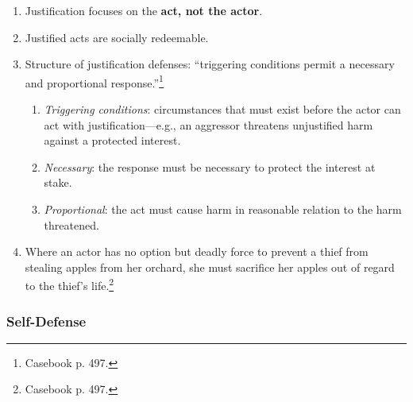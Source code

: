 \begin{enumerate}
    \item Justification focuses on the \textbf{act, not the actor}.
    \item Justified acts are socially redeemable.
    \item Structure of justification defenses: ``triggering conditions permit 
    a necessary and proportional response.''\footnote{Casebook p. 497.}
    \begin{enumerate}
        \item \emph{Triggering conditions}: circumstances that must exist 
        before the actor can act with justification---e.g., an aggressor 
        threatens unjustified harm against a protected interest.
        \item \emph{Necessary}: the response must be necessary to protect the 
        interest at stake.
        \item \emph{Proportional}: the act must cause harm in reasonable 
        relation to the harm threatened.
    \end{enumerate}
    \item Where an actor has no option but deadly force to prevent a thief 
    from stealing apples from her orchard, she must sacrifice her apples out 
    of regard to the thief's life.\footnote{Casebook p. 497.}
\end{enumerate}

\subsubsection{Self-Defense}

